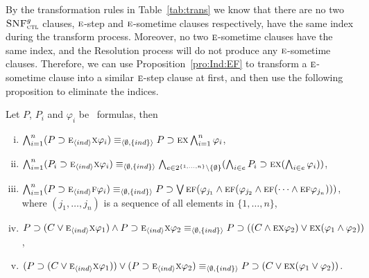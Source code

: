 \documentclass[letterpaper]{article} %
\begin{document}

By the transformation rules in Table~\ref{tab:trans} we know that there are no two ${\textsc{SNF}_{\textsc{ctl}}^g}$ clauses,  $\textsc{e}$-step and $\textsc{e}$-sometime clauses respectively, have the same index during the transform process. Moreover, no two $\textsc{e}$-sometime clauses have the same index, and the Resolution process will do not produce any $\textsc{e}$-sometime clauses. 
Therefore, we can use Proposition~\ref{pro:Ind:EF} to transform a $\textsc{e}$-sometime clause into a similar $\textsc{e}$-step clause at first, and then use the following proposition to eliminate the indices.

\begin{proposition}\label{pro:In2NI}
Let $P$, $P_i$ and $\varphi_i$ be \CTL\ formulas, then
\begin{enumerate}[(i)]
  \item $\bigwedge_{i=1}^n (P\supset \textsc{e}_{{\langle{ind}\rangle}} \textsc{x} \varphi_i)  \equiv_{{\langle{\emptyset, \{ind\}}\rangle}} P\supset \textsc{e} \textsc{x} \bigwedge_{i=1}^n \varphi_i$,
  \item $\bigwedge_{i=1}^n (P_i\supset \textsc{e}_{{\langle{ind}\rangle}} \textsc{x} \varphi_i) \equiv_{{\langle{\emptyset, \{ind\}}\rangle}} \bigwedge_{e \in 2^{\{1,\dots, n\}} \setminus \{\emptyset\}}(\bigwedge_{i\in e}P_i\supset \textsc{e} \textsc{x} (\bigwedge_{i\in e}\varphi_i))$,
  \item $\bigwedge_{i=1}^n (P\supset \textsc{e}_{{\langle{ind}\rangle}} \textsc{f} \varphi_i)  \equiv_{{\langle{\emptyset, \{ind\}}\rangle}} P\supset \bigvee\textsc{e}\textsc{f} (\varphi_{j_1} \wedge \textsc{e}\textsc{f}(\varphi_{j_2} \wedge \textsc{e}\textsc{f}(\dots \wedge \textsc{e}\textsc{f} \varphi_{j_n})))$, where $(j_1, \dots, j_n)$ is a sequence of all elements in $\{1, \dots, n\}$,
  \item $P\supset (C \vee \textsc{e}_{{\langle{ind}\rangle}} \textsc{x} \varphi_1) \wedge P \supset \textsc{e}_{{\langle{ind}\rangle}} \textsc{x} \varphi_2 \equiv_{{\langle{\emptyset, \{ind\}}\rangle}} P \supset ((C \wedge \textsc{e} \textsc{x} \varphi_2) \vee \textsc{e} \textsc{x} (\varphi_1 \wedge \varphi_2))$,
  \item $(P\supset (C \vee \textsc{e}_{{\langle{ind}\rangle}} \textsc{x} \varphi_1)) \vee (P \supset \textsc{e}_{{\langle{ind}\rangle}} \textsc{x} \varphi_2) \equiv_{{\langle{\emptyset, \{ind\}}\rangle}} P \supset (C \vee \textsc{e} \textsc{x} (\varphi_1 \vee \varphi_2))$.
\end{enumerate}
\end{proposition}
\end{document}
